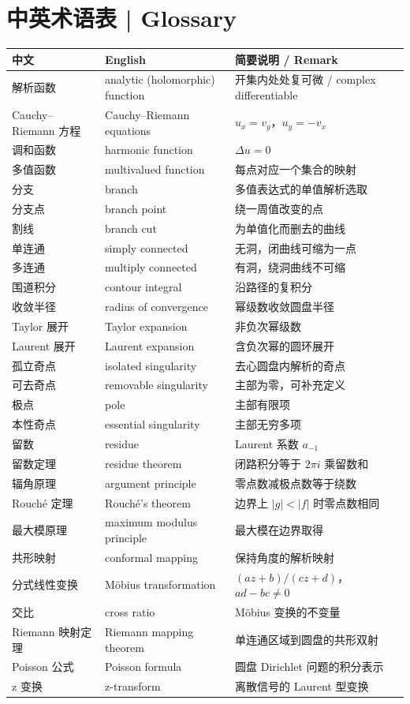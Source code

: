 \documentclass[UTF8,11pt,a4paper]{ctexart}
\begin{document}
\section*{中英术语表 | Glossary}
{\small
\begin{longtable}{p{3.2cm}p{5.1cm}p{6.2cm}}
\hline
中文 & English & 简要说明 / Remark \\
\hline
\endhead
解析函数 & analytic (holomorphic) function & 开集内处处复可微 / complex differentiable \\
Cauchy--Riemann 方程 & Cauchy--Riemann equations & $u_x=v_y$，$u_y=-v_x$ \\
调和函数 & harmonic function & $\Delta u=0$ \\
多值函数 & multivalued function & 每点对应一个集合的映射 \\
分支 & branch & 多值表达式的单值解析选取 \\
分支点 & branch point & 绕一周值改变的点 \\
割线 & branch cut & 为单值化而删去的曲线 \\
单连通 & simply connected & 无洞，闭曲线可缩为一点 \\
多连通 & multiply connected & 有洞，绕洞曲线不可缩 \\
围道积分 & contour integral & 沿路径的复积分 \\
收敛半径 & radius of convergence & 幂级数收敛圆盘半径 \\
Taylor 展开 & Taylor expansion & 非负次幂级数 \\
Laurent 展开 & Laurent expansion & 含负次幂的圆环展开 \\
孤立奇点 & isolated singularity & 去心圆盘内解析的奇点 \\
可去奇点 & removable singularity & 主部为零，可补充定义 \\
极点 & pole & 主部有限项 \\
本性奇点 & essential singularity & 主部无穷多项 \\
留数 & residue & Laurent 系数 $a_{-1}$ \\
留数定理 & residue theorem & 闭路积分等于 $2\pi i$ 乘留数和 \\
辐角原理 & argument principle & 零点数减极点数等于绕数 \\
Rouché 定理 & Rouché's theorem & 边界上 $|g|<|f|$ 时零点数相同 \\
最大模原理 & maximum modulus principle & 最大模在边界取得 \\
共形映射 & conformal mapping & 保持角度的解析映射 \\
分式线性变换 & Möbius transformation & $(az+b)/(cz+d)$，$ad-bc\ne0$ \\
交比 & cross ratio & Möbius 变换的不变量 \\
Riemann 映射定理 & Riemann mapping theorem & 单连通区域到圆盘的共形双射 \\
Poisson 公式 & Poisson formula & 圆盘 Dirichlet 问题的积分表示 \\
z 变换 & z-transform & 离散信号的 Laurent 型变换 \\
\hline
\end{longtable}
}
\end{document}
